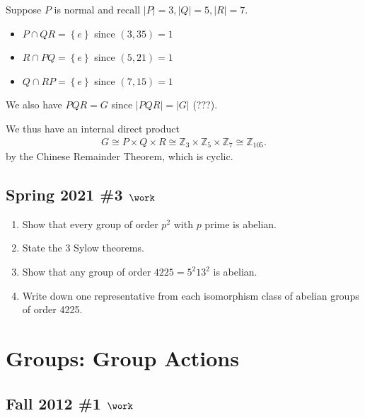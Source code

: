 \begin{solution}
Suppose \(P\) is normal and recall
\({\left\lvert {P} \right\rvert} = 3, {\left\lvert {Q} \right\rvert} = 5, {\left\lvert {R} \right\rvert} = 7\).

\begin{itemize}
\tightlist
\item
  \(P\cap QR = \left\{{e}\right\}\) since \((3, 35) = 1\)
\item
  \(R\cap PQ = \left\{{e}\right\}\) since \((5, 21) = 1\)
\item
  \(Q\cap RP = \left\{{e}\right\}\) since \((7, 15) = 1\)
\end{itemize}

We also have \(PQR = G\) since
\({\left\lvert {PQR} \right\rvert} = {\left\lvert {G} \right\rvert}\)
(???).

We thus have an internal direct product
\begin{align*}
G \cong P\times Q \times R \cong {\mathbb{Z}}_3 \times{\mathbb{Z}}_5 \times{\mathbb{Z}}_7 \cong {\mathbb{Z}}_{105}
.\end{align*}
by the Chinese Remainder Theorem, which is cyclic.

\end{solution}

\hypertarget{spring-2021-3-work}{%
\subsection{\texorpdfstring{Spring 2021 \#3
\(\work\)}{Spring 2021 \#3 \textbackslash work}}\label{spring-2021-3-work}}

\begin{enumerate}
\def\labelenumi{\alph{enumi}.}
\item
  Show that every group of order \(p^2\) with \(p\) prime is abelian.
\item
  State the 3 Sylow theorems.
\item
  Show that any group of order \(4225 = 5^2 13^2\) is abelian.
\item
  Write down one representative from each isomorphism class of abelian
  groups of order 4225.
\end{enumerate}

\hypertarget{groups-group-actions}{%
\section{Groups: Group Actions}\label{groups-group-actions}}

\hypertarget{fall-2012-1-work}{%
\subsection{\texorpdfstring{Fall 2012 \#1
\(\work\)}{Fall 2012 \#1 \textbackslash work}}\label{fall-2012-1-work}}

